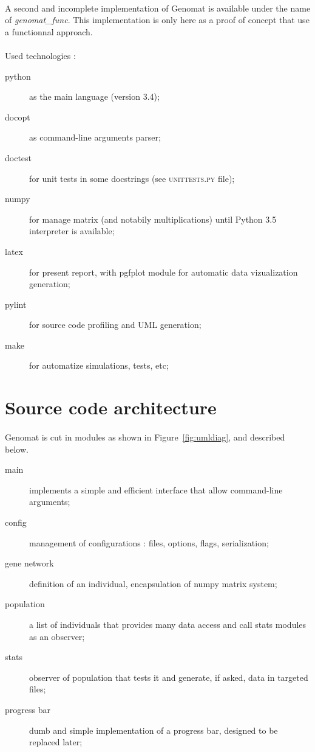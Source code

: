 \documentclass[]{report} %
\begin{document}
	\paragraph*{}
        A second and incomplete implementation of Genomat is available under the name of \textit{genomat\_func}. 
        This implementation is only here as a proof of concept that use a functionnal approach.

	\paragraph*{}
        Used technologies :
        \begin{description}
                \item[python] as the main language (version 3.4);
                \item[docopt] as command-line arguments parser;
                \item[doctest] for unit tests in some docstrings (see \textsc{unittests.py} file);
                \item[numpy] for manage matrix (and notabily multiplications) until Python 3.5 interpreter is available;
                \item[latex] for present report, with pgfplot module for automatic data vizualization generation;
                \item[pylint] for source code profiling and UML generation;
                \item[make] for automatize simulations, tests, etc;
        \end{description}





\section*{Source code architecture}
	\paragraph*{}
        Genomat is cut in modules as shown in Figure~\ref{fig:umldiag}, and described below.
        \begin{description}
                \item[main] implements a simple and efficient interface that allow command-line arguments;
                \item[config] management of configurations : files, options, flags, serialization;
                \item[gene network] definition of an individual, encapsulation of numpy matrix system;
                \item[population] a list of individuals that provides many data access and call stats modules as an observer;
                \item[stats] observer of population that tests it and generate, if asked, data in targeted files;
                \item[progress bar] dumb and simple implementation of a progress bar, designed to be replaced later;
        \end{description}
\end{document}
